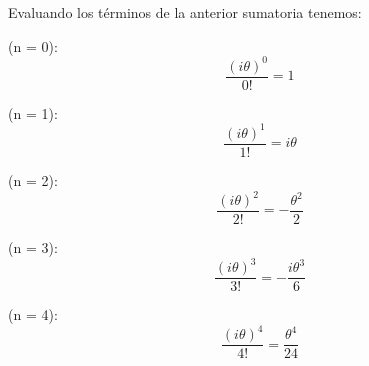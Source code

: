 \documentclass[preview]{standalone}
\begin{document}
\begin{center}
Evaluando los términos de la anterior sumatoria tenemos:

(n = 0):
$$ \frac{(i\theta)^0}{0!} = 1 $$

(n = 1):
$$ \frac{(i\theta)^1}{1!} = i\theta $$

(n = 2):
$$ \frac{(i\theta)^2}{2!} = -\frac{\theta^2}{2} $$

(n = 3):
$$ \frac{(i\theta)^3}{3!} = -\frac{i\theta^3}{6} $$

(n = 4):
$$ \frac{(i\theta)^4}{4!} = \frac{\theta^4}{24} $$
\end{center}
\end{document}
